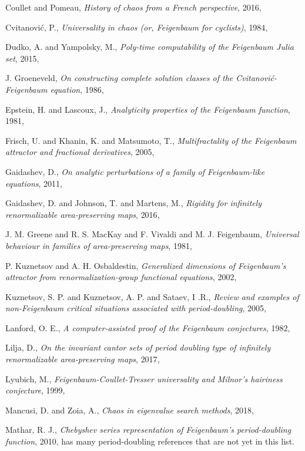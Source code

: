 \begin{description}
{Coullet and Pomeau},
{\em History of chaos from a {French} perspective},
{2016},

{Cvitanovi{\'c}, P.},
{\em Universality in chaos (or, {Feigenbaum} for cyclists)},
{1984},

{Dudko, A. and Yampolsky, M.},
  {\em Poly-time computability of the {Feigenbaum Julia} set},
{2015},

{J. Groeneveld},
{\em On constructing complete solution classes of the {Cvitanovi{\'c}-Feigenbaum} equation},
{1986},

{Epstein, H. and Lascoux, J.},
{\em Analyticity properties of the {Feigenbaum} function},
{1981},

{Frisch, U. and Khanin, K. and Matsumoto, T.},
{\em Multifractality of the {Feigenbaum} attractor and fractional derivatives},
{2005},

{Gaidashev, D.},
{\em On analytic perturbations of a family of {Feigenbaum}-like equations},
 {2011},

{Gaidashev, D. and Johnson, T. and Martens, M.},
{\em Rigidity for infinitely renormalizable area-preserving maps},
{2016},

{J. M. Greene and R. S. MacKay and F. Vivaldi and M. J. Feigenbaum},
{\em Universal behaviour in families of area-preserving maps},
{1981},

{P. Kuznetsov and A. H. Osbaldestin},
{\em Generalized dimensions of {Feigenbaum}'s attractor from renormalization-group functional equations},
{2002},

{Kuznetsov, S. P. and Kuznetsov, A. P. and Sataev, I .R.},
{\em Review and examples of non-{Feigenbaum} critical situations associated with period-doubling},
{2005},

{{Lanford}, O. E.},
{\em A computer-assisted proof of the {Feigenbaum} conjectures},
{1982},

{Lilja, D.},
{\em On the invariant cantor sets of period doubling type of infinitely
renormalizable area-preserving maps},
{2017},

{Lyubich, M.},
{\em {Feigenbaum-Coullet-Tresser} universality and {Milnor}'s hairiness conjecture},
{1999},

{Mancusi, D. and Zoia, A.},
{\em Chaos in eigenvalue search methods},
{2018},

{Mathar, R. J.},
{\em {Chebyshev} series representation of {Feigenbaum's} period-doubling function},
{2010}, has many period-doubling references that are not yet in this list.


\end{description}
